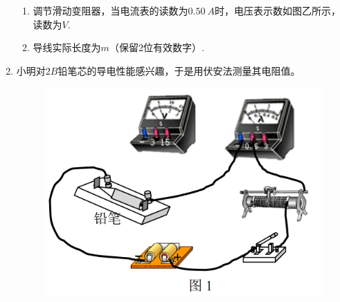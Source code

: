 \begin{enumerate}[leftmargin=0em]
\begin{enumerate}
\item 
调节滑动变阻器，当电流表的读数为$ 0.50\ A $时，电压表示数如图乙所示，读数为$ V $.
\item 
导线实际长度为$ m $（保留$ 2 $位有效数字）.





\end{enumerate}






\newpage
\item 
{}
小明对$ 2B $铅笔芯的导电性能感兴趣，于是用伏安法测量其电阻值。
\begin{figure}[h!]
\centering
\includegraphics[width=0.45\linewidth]{picture/screenshot010}


\end{figure}


\end{enumerate}
